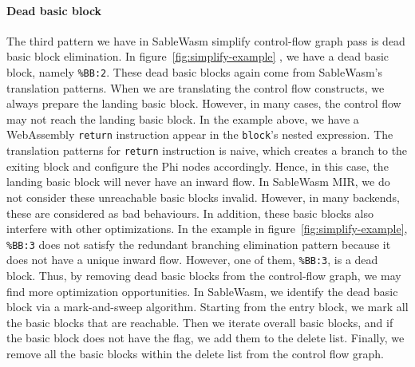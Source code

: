\paragraph{Dead basic block}
The third pattern we have in SableWasm simplify control-flow graph pass is dead basic block elimination. In figure~\ref{fig:simplify-example} , we have a dead basic block, namely \texttt{\%BB:2}. These dead basic blocks again come from   SableWasm's translation patterns. When we are translating the control flow constructs, we always prepare the landing basic block. However, in many cases, the control flow may not reach the landing basic block. In the example above, we have a WebAssembly \texttt{return} instruction appear in the \texttt{block}'s nested expression. The translation patterns for \texttt{return} instruction is naive, which creates a branch to the exiting block and configure the Phi nodes accordingly. Hence, in this case, the landing basic block will never have an inward flow. In SableWasm MIR, we do not consider these unreachable basic blocks invalid. However, in many backends, these are considered as bad behaviours. In addition, these basic blocks also interfere with other optimizations. In the example in figure~\ref{fig:simplify-example}, \texttt{\%BB:3} does not satisfy the redundant branching elimination pattern because it does not have a unique inward flow. However, one of them, \texttt{\%BB:3}, is a dead block. Thus, by removing dead basic blocks from the control-flow graph, we may find more optimization opportunities. In SableWasm, we identify the dead basic block via a mark-and-sweep algorithm. Starting from the entry block, we mark all the basic blocks that are reachable. Then we iterate overall basic blocks, and if the basic block does not have the flag, we add them to the delete list. Finally, we remove all the basic blocks within the delete list from the control flow graph.

